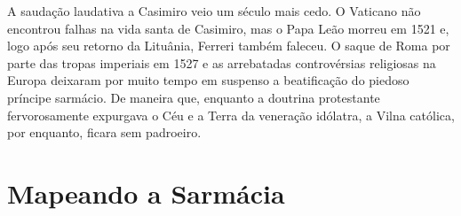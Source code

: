 A saudação laudativa a Casimiro veio um século mais cedo. O Vaticano não
encontrou falhas na vida santa de Casimiro, mas o Papa Leão  morreu em
1521 e, logo após seu retorno da Lituânia, Ferreri também faleceu. O
saque de Roma por parte das tropas imperiais em 1527 e as arrebatadas
controvérsias religiosas na Europa deixaram por muito tempo em suspenso
a beatificação do piedoso príncipe sarmácio. De maneira que, enquanto a
doutrina protestante fervorosamente expurgava o Céu e a Terra da
veneração idólatra, a Vilna católica, por enquanto, ficara sem
padroeiro.

%

\chapter{Mapeando a Sarmácia}

\begin{epigraphs} 
\end{epigraphs}

